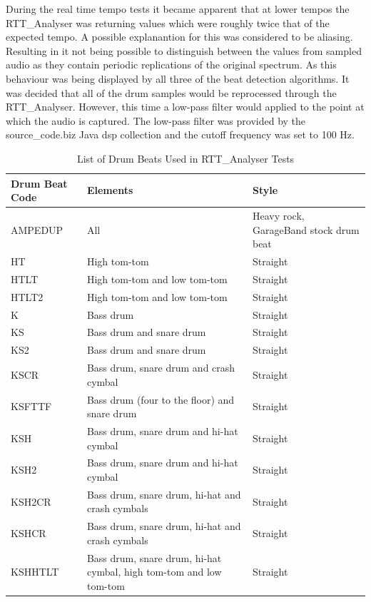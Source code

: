 \documentclass[a4paper, 11pt]{article}
\begin{document}
During the real time tempo tests it became apparent that at lower tempos the RTT\_Analyser was returning values which were roughly twice that of the expected tempo. A possible explanantion for this was considered to be aliasing. Resulting in it not being possible to distinguish between the values from sampled audio as they contain periodic replications of the original spectrum\cite{lyons}. As this behaviour was being displayed by all three of the beat detection algorithms. It was decided that all of the drum samples would be reprocessed through the RTT\_Analyser. However, this time a low-pass filter would applied to the point at which the audio is captured. The low-pass filter was provided by the source\_code.biz Java dsp collection and the cutoff frequency was set to 100 Hz.
\clearpage

\begin{table}[htbp]
\vspace{-1in}
\caption{List of Drum Beats Used in RTT\_Analyser Tests} 
\centering
\begin{tabular}{|p{3cm}|p{4cm}|l|}
\hline
\textbf{Drum Beat Code} & \textbf{Elements} & \textbf{Style} \\ [0.5ex]
\hline 
AMPEDUP & All & Heavy rock, GarageBand stock drum beat\\
\hline 
HT & High tom-tom & Straight\\
\hline 
HTLT & High tom-tom and low tom-tom & Straight\\
\hline 
HTLT2 & High tom-tom and low tom-tom & Straight\\
\hline 
K & Bass drum & Straight\\
\hline 
KS & Bass drum and snare drum & Straight\\
\hline 
KS2 & Bass drum and snare drum & Straight\\
\hline 
KSCR & Bass drum, snare drum and crash cymbal & Straight\\
\hline 
KSFTTF & Bass drum (four to the floor) and snare drum & Straight\\
\hline 
KSH & Bass drum, snare drum and hi-hat cymbal & Straight\\
\hline 
KSH2 & Bass drum, snare drum and hi-hat cymbal & Straight\\
\hline 
KSH2CR & Bass drum, snare drum, hi-hat and crash cymbals & Straight\\
\hline 
KSHCR & Bass drum, snare drum, hi-hat and crash cymbals & Straight\\
\hline 
KSHHTLT & Bass drum, snare drum, hi-hat cymbal, high tom-tom and low tom-tom & Straight\\

\end{tabular}
\end{table}
\end{document}

